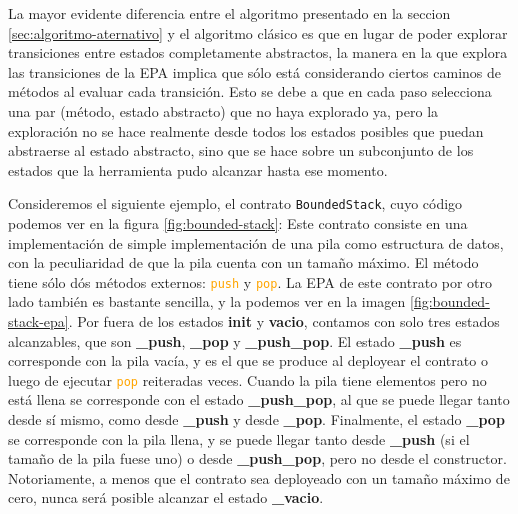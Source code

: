 La mayor evidente diferencia entre el algoritmo presentado en la seccion \ref{sec:algoritmo-aternativo} y el algoritmo clásico es que en lugar de poder explorar transiciones entre estados completamente abstractos, la manera en la que explora las transiciones de la EPA implica que sólo está considerando ciertos caminos de métodos al evaluar cada transición.
Esto se debe a que en cada paso selecciona una par (método, estado abstracto) que no haya explorado ya, pero la exploración no se hace realmente desde todos los estados posibles que puedan abstraerse al estado abstracto, sino que se hace sobre un subconjunto de los estados que la herramienta pudo alcanzar hasta ese momento.

Consideremos el siguiente ejemplo, el contrato \texttt{BoundedStack}, cuyo código podemos ver en la figura \ref{fig:bounded-stack}:
Este contrato consiste en una implementación de simple implementación de una pila como estructura de datos, con la peculiaridad de que la pila cuenta con un tamaño máximo.
El método tiene sólo dós métodos externos: \textcolor{orange}{\texttt{push}} y \textcolor{orange}{\texttt{pop}}.
La EPA de este contrato por otro lado también es bastante sencilla, y la podemos ver en la imagen \ref{fig:bounded-stack-epa}.
Por fuera de los estados \textbf{init} y \textbf{vacio}, contamos con solo tres estados alcanzables, que son \textbf{\_push}, \textbf{\_pop} y \textbf{\_push\_pop}.
El estado \textbf{\_push} es corresponde con la pila vacía, y es el que se produce al deployear el contrato o luego de ejecutar \textcolor{orange}{\texttt{pop}} reiteradas veces.
Cuando la pila tiene elementos pero no está llena se corresponde con el estado \textbf{\_push\_pop}, al que se puede llegar tanto desde sí mismo, como desde \textbf{\_push} y desde \textbf{\_pop}.
Finalmente, el estado \textbf{\_pop} se corresponde con la pila llena, y se puede llegar tanto desde \textbf{\_push} (si el tamaño de la pila fuese uno) o desde \textbf{\_push\_pop}, pero no desde el constructor.
Notoriamente, a menos que el contrato sea deployeado con un tamaño máximo de cero, nunca será posible alcanzar el estado \textbf{\_vacio}.

